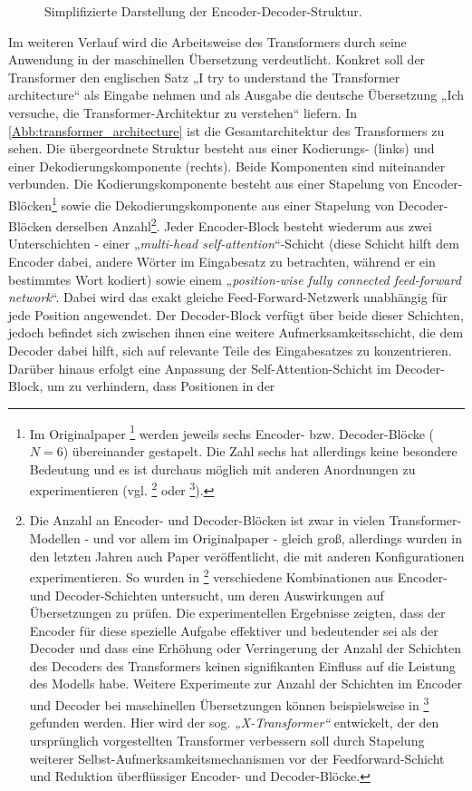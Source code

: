 \begin{figure}[htb]
	\centering
	
	\caption{Simplifizierte Darstellung der Encoder-Decoder-Struktur.}
	\label{Abb:Encoder_Decoder_Structure}
\end{figure}

Im weiteren Verlauf wird die Arbeitsweise des Transformers durch seine Anwendung in der maschinellen Übersetzung verdeutlicht. Konkret soll der Transformer den englischen Satz „I try to understand the Transformer architecture“ als Eingabe nehmen und als Ausgabe die deutsche Übersetzung „Ich versuche, die Transformer-Architektur zu verstehen“ liefern. In \cref{Abb:transformer_architecture} ist die Gesamtarchitektur des Transformers zu sehen. Die übergeordnete Struktur besteht aus einer Kodierungs- (links) und einer Dekodierungskomponente (rechts). Beide Komponenten sind miteinander verbunden. Die Kodierungskomponente besteht aus einer Stapelung von Encoder-Blöcken\footnote{Im Originalpaper \footcite{Attention_is_all_you_need} werden jeweils sechs Encoder- bzw. Decoder-Blöcke ($N=6$) übereinander gestapelt. Die Zahl sechs hat allerdings keine besondere Bedeutung und es ist durchaus möglich mit anderen Anordnungen zu experimentieren (vgl. \footcite{BERT} oder \footcite{GPT}).} sowie die Dekodierungskomponente aus einer Stapelung von Decoder-Blöcken derselben Anzahl\footnote{Die Anzahl an Encoder- und Decoder-Blöcken ist zwar in vielen Transformer-Modellen - und vor allem im Originalpaper - gleich groß, allerdings wurden in den letzten Jahren auch Paper veröffentlicht, die mit anderen Konfigurationen experimentieren. So wurden in \footcite{TransformerDiffEncoderDecoderLayers} verschiedene Kombinationen aus Encoder- und Decoder-Schichten untersucht, um deren Auswirkungen auf Übersetzungen zu prüfen. Die experimentellen Ergebnisse zeigten, dass der Encoder für diese spezielle Aufgabe effektiver und bedeutender sei als der Decoder und dass eine Erhöhung oder Verringerung der Anzahl der Schichten des Decoders des Transformers keinen signifikanten Einfluss auf die Leistung des Modells habe. Weitere Experimente zur Anzahl der Schichten im Encoder und Decoder bei maschinellen Übersetzungen können beispielsweise in \footcite{X-Transformer} gefunden werden. Hier wird der sog. \emph{„X-Transformer“} entwickelt, der den ursprünglich vorgestellten Transformer verbessern soll durch Stapelung weiterer Selbst-Aufmerksamkeitsmechanismen vor der Feedforward-Schicht und Reduktion überflüssiger Encoder- und Decoder-Blöcke.}. Jeder Encoder-Block besteht wiederum aus zwei Unterschichten - einer „\emph{multi-head self-attention}“-Schicht (diese Schicht hilft dem Encoder dabei, andere Wörter im Eingabesatz zu betrachten, während er ein bestimmtes Wort kodiert) sowie einem „\emph{position-wise fully connected feed-forward network}“. Dabei wird das exakt gleiche Feed-Forward-Netzwerk unabhängig für jede Position angewendet. Der Decoder-Block verfügt über beide dieser Schichten, jedoch befindet sich zwischen ihnen eine weitere Aufmerksamkeitsschicht, die dem Decoder dabei hilft, sich auf relevante Teile des Eingabesatzes zu konzentrieren. Darüber hinaus erfolgt eine Anpassung der Self-Attention-Schicht im Decoder-Block, um zu verhindern, dass Positionen in der 